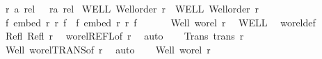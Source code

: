 \begin{isabellebody}
\ r\ {\isacharcolon}{\kern0pt}{\isacharcolon}{\kern0pt}{\isachardoublequoteopen}{\isacharprime}{\kern0pt}a\ rel{\isachardoublequoteclose}\ \ \ r{\isacharprime}{\kern0pt}{\isacharcolon}{\kern0pt}{\isacharcolon}{\kern0pt}{\isachardoublequoteopen}{\isacharprime}{\kern0pt}a{\isacharprime}{\kern0pt}\ rel{\isachardoublequoteclose}\isanewline
{}\ WELL{\isacharcolon}{\kern0pt}\ {\isachardoublequoteopen}Well{\isacharunderscore}{\kern0pt}order\ r{\isachardoublequoteclose}\ \ WELL{\isacharprime}{\kern0pt}{\isacharcolon}{\kern0pt}\ {\isachardoublequoteopen}Well{\isacharunderscore}{\kern0pt}order\ r{\isacharprime}{\kern0pt}{\isachardoublequoteclose}\isanewline
{}\ {\isachardoublequoteopen}{\isacharparenleft}{\kern0pt}{\isasymexists}f{\isachardot}{\kern0pt}\ embed\ r\ r{\isacharprime}{\kern0pt}\ f{\isacharparenright}{\kern0pt}\ {\isasymor}\ {\isacharparenleft}{\kern0pt}{\isasymexists}f{\isacharprime}{\kern0pt}{\isachardot}{\kern0pt}\ embed\ r{\isacharprime}{\kern0pt}\ r\ f{\isacharprime}{\kern0pt}{\isacharparenright}{\kern0pt}{\isachardoublequoteclose}\isanewline
%
\isadelimproof
%
\endisadelimproof
%
\isatagproof
{}\isamarkupfalse%
{\isacharminus}{\kern0pt}\isanewline
\ \ \isanewline
\ \ \isamarkupfalse%
\ Well{\isacharcolon}{\kern0pt}\ {\isachardoublequoteopen}wo{\isacharunderscore}{\kern0pt}rel\ r{\isachardoublequoteclose}\ \isamarkupfalse%
\ WELL\ \isamarkupfalse%
\ wo{\isacharunderscore}{\kern0pt}rel{\isacharunderscore}{\kern0pt}def\ \isacommand{{\isachardot}{\kern0pt}}\isamarkupfalse%
\isanewline
\ \ \isamarkupfalse%
\ Refl{\isacharcolon}{\kern0pt}\ {\isachardoublequoteopen}Refl\ r{\isachardoublequoteclose}\ \isamarkupfalse%
\ wo{\isacharunderscore}{\kern0pt}rel{\isachardot}{\kern0pt}REFL{\isacharbrackleft}{\kern0pt}of\ r{\isacharbrackright}{\kern0pt}\ \isamarkupfalse%
\ auto\isanewline
\ \ \isamarkupfalse%
\ Trans{\isacharcolon}{\kern0pt}\ {\isachardoublequoteopen}trans\ r{\isachardoublequoteclose}\ \isamarkupfalse%
\ Well\ wo{\isacharunderscore}{\kern0pt}rel{\isachardot}{\kern0pt}TRANS{\isacharbrackleft}{\kern0pt}of\ r{\isacharbrackright}{\kern0pt}\ \isamarkupfalse%
\ auto\isanewline
\ \ \isamarkupfalse%
\ Well{\isacharprime}{\kern0pt}{\isacharcolon}{\kern0pt}\ {\isachardoublequoteopen}wo{\isacharunderscore}{\kern0pt}rel\ r{\isacharprime}{\kern0pt}{\isachardoublequoteclose}\ \isamarkupfalse%

\end{isabellebody}
